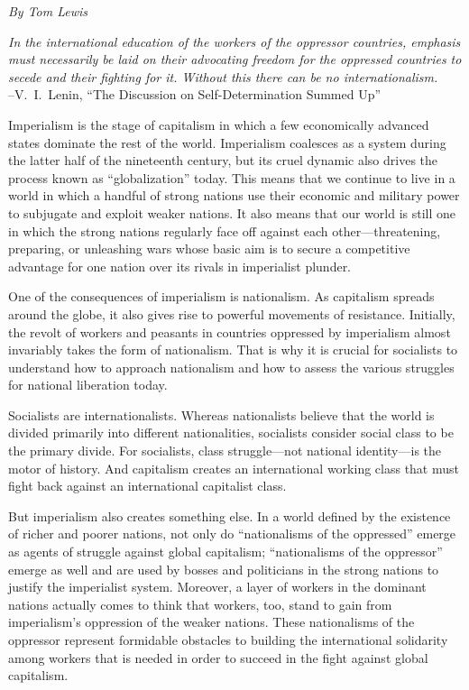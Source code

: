 \emph{By Tom Lewis}

\begin{flushleft}\emph{In the international education of the workers of the oppressor countries, emphasis must necessarily be laid on their advocating freedom for the oppressed countries to secede and their fighting for it. Without this there can be no internationalism.}\\
--V.\ I.\ Lenin, ``The Discussion on Self-Determination Summed Up''
\end{flushleft}

Imperialism is the stage of capitalism in which a few economically advanced states dominate the rest of the world. Imperialism coalesces as a system during the latter half of the nineteenth century, but its cruel dynamic also drives the process known as ``globalization'' today. This means that we continue to live in a world in which a handful of strong nations use their economic and military power to subjugate and exploit weaker nations. It also means that our world is still one in which the strong nations regularly face off against each other---threatening, preparing, or unleashing wars whose basic aim is to secure a competitive advantage for one nation over its rivals in imperialist plunder.

One of the consequences of imperialism is nationalism. As capitalism spreads around the globe, it also gives rise to powerful movements of resistance. Initially, the revolt of workers and peasants in countries oppressed by imperialism almost invariably takes the form of nationalism. That is why it is crucial for socialists to understand how to approach nationalism and how to assess the various struggles for national liberation today.

Socialists are internationalists. Whereas nationalists believe that the world is divided primarily into different nationalities, socialists consider social class to be the primary divide. For socialists, class struggle---not national identity---is the motor of history. And capitalism creates an international working class that must fight back against an international capitalist class.

But imperialism also creates something else. In a world defined by the existence of richer and poorer nations, not only do ``nationalisms of the oppressed'' emerge as agents of struggle against global capitalism; ``nationalisms of the oppressor'' emerge as well and are used by bosses and politicians in the strong nations to justify the imperialist system. Moreover, a layer of workers in the dominant nations actually comes to think that workers, too, stand to gain from imperialism's oppression of the weaker nations. These nationalisms of the oppressor represent formidable obstacles to building the international solidarity among workers that is needed in order to succeed in the fight against global capitalism.

